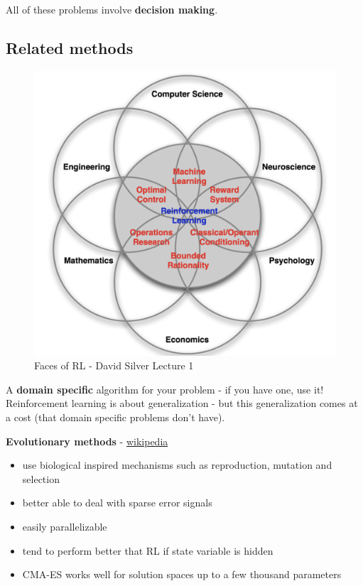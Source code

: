 \documentclass[]{article}
\providecommand{\tightlist}{%
  \setlength{\itemsep}{0pt}\setlength{\parskip}{0pt}}
\begin{document}
All of these problems involve \textbf{decision making}.

\newpage

\hypertarget{related-methods}{%
\subsection{Related methods}\label{related-methods}}

\begin{figure}
\centering
\includegraphics[width=\textwidth,height=0.35\textheight]{./tex2pdf.-4c1708fb449e9e84/4e5835c194f814b7abab51f3cbf790fcc60291b9.png}
\caption{Faces of RL - David Silver Lecture 1}
\end{figure}

A \textbf{domain specific} algorithm for your problem - if you have one,
use it! Reinforcement learning is about generalization - but this
generalization comes at a cost (that domain specific problems don't
have).

\textbf{Evolutionary methods} -
\href{https://en.wikipedia.org/wiki/Evolutionary_algorithm}{wikipedia}

\begin{itemize}
\tightlist
\item
  use biological inspired mechanisms such as reproduction, mutation and
  selection
\item
  better able to deal with sparse error signals
\item
  easily parallelizable
\item
  tend to perform better that RL if state variable is hidden
\item
  CMA-ES works well for solution spaces up to a few thousand parameters
\end{itemize}
\end{document}
